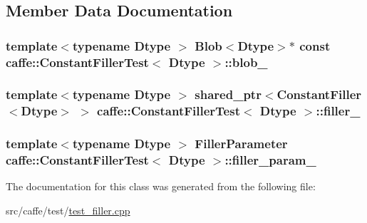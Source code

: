 \subsection{Member Data Documentation}
\hypertarget{classcaffe_1_1_constant_filler_test_a3c61da8de712122294a6b0df36f9f6a7}{
\subsubsection[{blob\+\_\+}]{\setlength{\rightskip}{0pt plus 5cm}template$<$typename Dtype $>$ {\bf Blob}$<$Dtype$>$$\ast$ const {\bf caffe\+::\+Constant\+Filler\+Test}$<$ Dtype $>$\+::blob\+\_\+\hspace{0.3cm}{\ttfamily [protected]}}}\label{classcaffe_1_1_constant_filler_test_a3c61da8de712122294a6b0df36f9f6a7}
\hypertarget{classcaffe_1_1_constant_filler_test_adc3aca9d62166a3d14202317bbb89a3d}{
\subsubsection[{filler\+\_\+}]{\setlength{\rightskip}{0pt plus 5cm}template$<$typename Dtype $>$ shared\+\_\+ptr$<${\bf Constant\+Filler}$<$Dtype$>$ $>$ {\bf caffe\+::\+Constant\+Filler\+Test}$<$ Dtype $>$\+::filler\+\_\+\hspace{0.3cm}{\ttfamily [protected]}}}\label{classcaffe_1_1_constant_filler_test_adc3aca9d62166a3d14202317bbb89a3d}
\hypertarget{classcaffe_1_1_constant_filler_test_ae7c14a37c8b6370fc539cd82fb90d972}{
\subsubsection[{filler\+\_\+param\+\_\+}]{\setlength{\rightskip}{0pt plus 5cm}template$<$typename Dtype $>$ Filler\+Parameter {\bf caffe\+::\+Constant\+Filler\+Test}$<$ Dtype $>$\+::filler\+\_\+param\+\_\+\hspace{0.3cm}{\ttfamily [protected]}}}\label{classcaffe_1_1_constant_filler_test_ae7c14a37c8b6370fc539cd82fb90d972}


The documentation for this class was generated from the following file\+:\begin{DoxyCompactItemize}
\item 
src/caffe/test/\hyperlink{test__filler_8cpp}{test\+\_\+filler.\+cpp}\end{DoxyCompactItemize}
